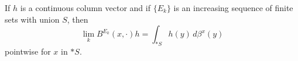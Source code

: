 If $h$ is a continuous column vector and if $\{E_k\}$ is an increasing sequence of finite sets with union $S$, then
$$
\lim_k B^{E_k}(x, \cdot)h = \int_{*S} h(y)\,d\beta^x(y)
$$
pointwise for $x$ in $*S$.
